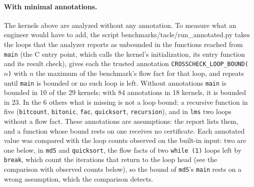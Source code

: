 \documentclass[oneside,english]{amsart}
\numberwithin{equation}{section}
\numberwithin{figure}{section}
\theoremstyle{plain}
\theoremstyle{definition}
\theoremstyle{plain}
\theoremstyle{remark}
\theoremstyle{plain}
\theoremstyle{definition}
\theoremstyle{plain}
\theoremstyle{remark}
\newcommand{\lean}[1]{{\ttfamily\small #1}}
\begin{document}
\paragraph{With minimal annotations.}
The kernels above are analyzed without any annotation. To measure what an engineer would have to add, the script \lean{benchmarks/tacle/run\_annotated.py} takes the loops that the analyzer reports as unbounded in the functions reached from \texttt{main} (the C entry point, which calls the kernel's initialization, its entry function and its result check), gives each the trusted annotation \texttt{CROSSCHECK\_LOOP\_BOUND(}$n$\texttt{)} with $n$ the maximum of the benchmark's flow fact for that loop, and repeats until \texttt{main} is bounded or no such loop is left. Without annotations \texttt{main} is bounded in 10 of the 29 kernels; with 84 annotations in 18 kernels, it is bounded in 23. In the 6 others what is missing is not a loop bound: a recursive function in five (\texttt{bitcount}, \texttt{bitonic}, \texttt{fac}, \texttt{quicksort}, \texttt{recursion}), and in \texttt{lms} two loops without a flow fact. These annotations are assumptions: the report lists them, and a function whose bound rests on one receives no certificate. Each annotated value was compared with the loop counts observed on the built-in input: two are one below, in \texttt{md5} and \texttt{quicksort}, the flow facts of two \texttt{while (1)} loops left by \texttt{break}, which count the iterations that return to the loop head (see the comparison with observed counts below), so the bound of \texttt{md5}'s \texttt{main} rests on a wrong assumption, which the comparison detects.
\end{document}
